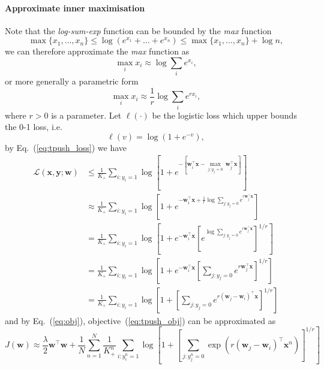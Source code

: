 \documentclass[9pt]{extarticle}
\newcommand{\x}{\mathbf{x}}
\newcommand{\y}{\mathbf{y}}
\newcommand{\1}{\mathbf{1}}
\newcommand{\w}{\mathbf{w}}
\newcommand{\LCal}{\mathcal{L}}
\newcommand{\ie}{i.e.\ }
\begin{document}
\paragraph{Approximate inner maximisation}
Note that the \emph{log-sum-exp} function can be bounded by the \emph{max} function~\cite[p. 72]{boyd2004convex}
$$
\max\{x_1, \dots, x_n\} \le \log(e^{x_1} + \dots + e^{x_n}) \le \max\{x_1, \dots, x_n\} + \log n,
$$
we can therefore approximate the \emph{max} function as
$$
\max_i x_i \approx \log \sum_i e^{x_i},
$$
or more generally a parametric form
$$
\max_i x_i \approx \frac{1}{r} \log \sum_i e^{r x_i},
$$
where $r > 0$ is a parameter.
%
Let $\ell(\cdot)$ be the logistic loss which upper bounds the 0-1 loss, \ie 
$$
\ell(v) = \log(1 + e^{-v}),
$$
by Eq.~(\ref{eq:tpush_loss}) we have
%
\begin{equation}
\label{eq:tpush_loss_approx}
\begin{aligned}
\LCal(\x, \y; \w)
&\le \frac{1}{K_+} \sum_{i:y_i=1}
     \log \left[ 1 + e^{- \left[ \w_i^\top \x - \underset{j:y_j=0}{\max} \, \w_j^\top \x \right]} \right] \\
&\approx \frac{1}{K_+} \sum_{i:y_i=1}
         \log \left[ 1 + e^{-\w_i^\top \x + \frac{1}{r} \log \underset{j:y_j=0}{\sum} e^{r \w_j^\top \x}} \right] \\
&= \frac{1}{K_+} \sum_{i:y_i=1}
   \log \left[ 1 + e^{-\w_i^\top \x} \left[ e^{\log \underset{j:y_j=0}{\sum} e^{r \w_j^\top \x}} \right]^{1/r} \right] \\
&= \frac{1}{K_+} \sum_{i:y_i=1}
   \log \left[ 1 + e^{-\w_i^\top \x} \left[ \underset{j:y_j=0}{\sum} e^{r \w_j^\top \x} \right]^{1/r} \right] \\
&= \frac{1}{K_+} \sum_{i:y_i=1}
   \log \left[ 1 + \left[ \underset{j:y_j=0}{\sum} e^{r (\w_j - \w_i)^\top \x} \right]^{1/r} \right]
\end{aligned}
\end{equation}
and by Eq.~(\ref{eq:obj}), objective~(\ref{eq:tpush_obj}) can be approximated as
\begin{equation}
\label{eq:tpush_obj_approx}
J(\w) \approx \frac{\lambda}{2} \w^\top \w + \frac{1}{N} \sum_{n=1}^N \frac{1}{K_+^n} \sum_{i:y_i^n=1}
              \log \left[ 1 + \left[ \underset{j:y_j^n=0}{\sum} \exp \left( r (\w_j - \w_i)^\top \x^n \right) \right]^{1/r} \right]
\end{equation}
\end{document}
